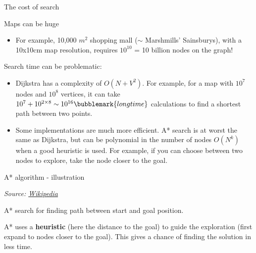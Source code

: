 \documentclass[compress,xcolor=table]{beamer}
\newcommand{\source}[2]{{\tiny\it Source: \href{#1}{#2}}}
\begin{document}
\begin{frame}{The cost of search}

Maps can be huge

\begin{itemize}
    \item For example, 10,000 $m^2$ shopping mall ($\sim$ Marshmills'
        Sainsburys), with a 10x10cm map resolution, requires $10^{10}$ = 10
        billion nodes on the graph!
\end{itemize}

Search time can be problematic:

\begin{itemize}
\item Dijkstra has a complexity of $O(N+V^2)$. For example, for a map with
    $10^7$ nodes and $10^8$ vertices, it can take $10^7+10^{2\times 8} \sim
        10^{16}\bubblemark{longtime}$ calculations to
  find a shortest path between two points.
\item Some implementations are much more efficient. A* search is at worst
  the same as Dijkstra, but can be polynomial in the number of nodes
  $O(N^k)$ when a good heuristic is used. For example, if you can
  choose between two nodes to explore, take the node closer to the goal.
\end{itemize}

\end{frame}

\begin{frame}{A* algorithm - illustration}

    \begin{center}

        \source{http://en.wikipedia.org/wiki/A*_search_algorithm}{Wikipedia}
    \end{center}

    A* search for finding path between start and goal position.

    A* uses a \textbf{heuristic} (here the distance to the goal) to guide the
    exploration (first expand to nodes closer to the goal). This gives a chance of finding
    the solution in less time.

\end{frame}
\end{document}
